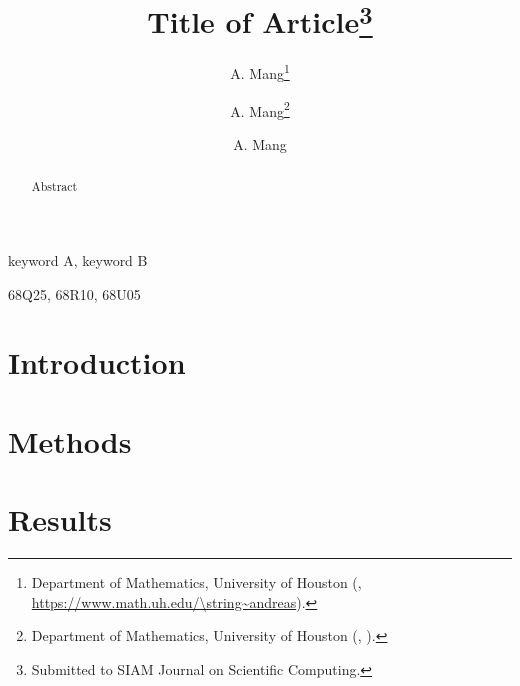 \documentclass[review,onefignum,onetabnum]{siamart190516}
\title{Title of Article\thanks{Submitted to SIAM Journal on Scientific Computing.\funding{Funding}}}
\author{A. Mang\thanks{Department of Mathematics, University of Houston (\email{andreas@math.uh.edu}, \url{https://www.math.uh.edu/\string~andreas}).}
\and A. Mang\thanks{Department of Mathematics, University of Houston (\email{andreas@math.uh.edu}, \email{andreas@math.uh.edu}).}
\and A. Mang\footnotemark[3]}
\begin{document}
\maketitle

\begin{abstract}
Abstract
\end{abstract}

\begin{keywords}
keyword A, keyword B
\end{keywords}

\begin{AMS}
68Q25, 68R10, 68U05
\end{AMS}



\section{Introduction}\label{s:intro}



\section{Methods}\label{s:methods}



\section{Results}\label{s:results}

%
%
\end{document}
